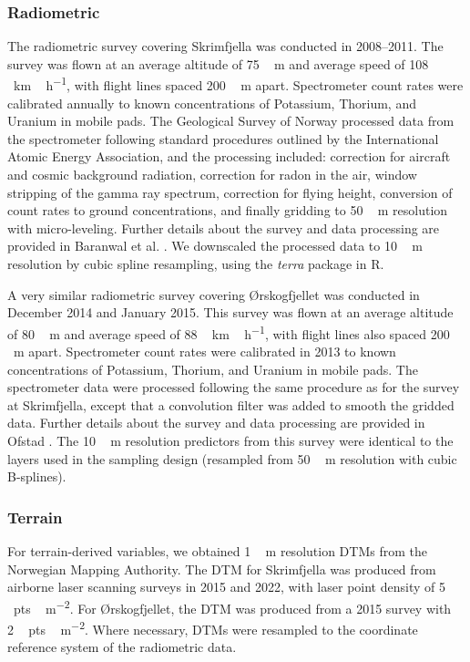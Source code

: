 \documentclass[soil, manuscript]{copernicus}
\begin{document}
\subsubsection{Radiometric}

The radiometric survey covering Skrimfjella was conducted in 2008--2011.
The survey was flown at an average altitude of \unit{75\,m} and average speed of \unit{108\,km\,h^{-1}}, with flight lines spaced \unit{200\,m} apart.
Spectrometer count rates were calibrated annually to known concentrations of Potassium, Thorium, and Uranium in mobile pads.
The Geological Survey of Norway processed data from the spectrometer following standard procedures outlined by the International Atomic Energy Association, and the processing included: correction for aircraft and cosmic background radiation, correction for radon in the air, window stripping of the gamma ray spectrum, correction for flying height, conversion of count rates to ground concentrations, and finally gridding to \unit{50\,m} resolution with micro-leveling.
Further details about the survey and data processing are provided in Baranwal et al. \citeyearpar{baranwalHelicopterborneMagneticElectromagnetic2013}.
We downscaled the processed data to \unit{10\,m} resolution by cubic spline resampling, using the \emph{terra} package in R.

A very similar radiometric survey covering Ørskogfjellet was conducted in December 2014 and January 2015.
This survey was flown at an average altitude of \unit{80\,m} and average speed of \unit{88\,km\,h^{-1}}, with flight lines also spaced \unit{200\,m} apart.
Spectrometer count rates were calibrated in 2013 to known concentrations of Potassium, Thorium, and Uranium in mobile pads.
The spectrometer data were processed following the same procedure as for the survey at Skrimfjella, except that a convolution filter was added to smooth the gridded data.
Further details about the survey and data processing are provided in Ofstad \citeyearpar{ofstadHelicopterborneMagneticRadiometric2015}.
The \unit{10\,m} resolution predictors from this survey were identical to the layers used in the sampling design (resampled from \unit{50\,m} resolution with cubic B-splines).

\subsubsection{Terrain}

For terrain-derived variables, we obtained \unit{1\,m} resolution DTMs from the Norwegian Mapping Authority.
The DTM for Skrimfjella was produced from airborne laser scanning surveys in 2015 and 2022, with laser point density of \unit{5\,pts\,m^{-2}}.
For Ørskogfjellet, the DTM was produced from a 2015 survey with \unit{2\,pts\,m^{-2}}.
Where necessary, DTMs were resampled to the coordinate reference system of the radiometric data.
\end{document}
